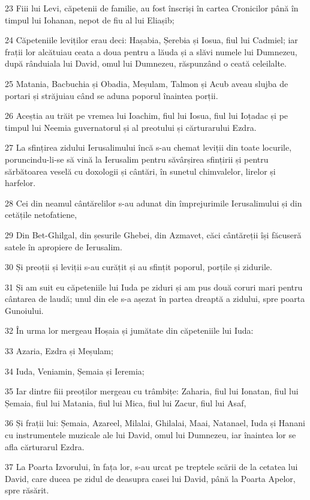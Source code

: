 \par 23 Fiii lui Levi, căpetenii de familie, au fost înscriși în cartea Cronicilor până în timpul lui Iohanan, nepot de fiu al lui Eliașib;
\par 24 Căpeteniile leviților erau deci: Hașabia, Șerebia și Iosua, fiul lui Cadmiel; iar frații lor alcătuiau ceata a doua pentru a lăuda și a slăvi numele lui Dumnezeu, după rânduiala lui David, omul lui Dumnezeu, răspunzând o ceată celeilalte.
\par 25 Matania, Bacbuchia și Obadia, Meșulam, Talmon și Acub aveau slujba de portari și străjuiau când se aduna poporul înaintea porții.
\par 26 Aceștia au trăit pe vremea lui Ioachim, fiul lui Iosua, fiul lui Ioțadac și pe timpul lui Neemia guvernatorul și al preotului și cărturarului Ezdra.
\par 27 La sfințirea zidului Ierusalimului încă s-au chemat leviții din toate locurile, poruncindu-li-se să vină la Ierusalim pentru săvârșirea sfințirii și pentru sărbătoarea veselă cu doxologii și cântări, în sunetul chimvalelor, lirelor și harfelor.
\par 28 Cei din neamul cântărelilor s-au adunat din împrejurimile Ierusalimului și din cetățile netofatiene,
\par 29 Din Bet-Ghilgal, din șesurile Ghebei, din Azmavet, căci cântăreții își făcuseră satele în apropiere de Ierusalim.
\par 30 Și preoții și leviții s-au curățit și au sfințit poporul, porțile și zidurile.
\par 31 Și am suit eu căpeteniile lui Iuda pe ziduri și am pus două coruri mari pentru cântarea de laudă; unul din ele s-a așezat în partea dreaptă a zidului, spre poarta Gunoiului.
\par 32 În urma lor mergeau Hoșaia și jumătate din căpeteniile lui Iuda:
\par 33 Azaria, Ezdra și Meșulam;
\par 34 Iuda, Veniamin, Șemaia și Ieremia;
\par 35 Iar dintre fiii preoților mergeau cu trâmbițe: Zaharia, fiul lui Ionatan, fiul lui Șemaia, fiul lui Matania, fiul lui Mica, fiul lui Zacur, fiul lui Asaf,
\par 36 Și frații lui: Șemaia, Azareel, Milalai, Ghilalai, Maai, Natanael, Iuda și Hanani cu instrumentele muzicale ale lui David, omul lui Dumnezeu, iar înaintea lor se afla cărturarul Ezdra.
\par 37 La Poarta Izvorului, în fața lor, s-au urcat pe treptele scării de la cetatea lui David, care ducea pe zidul de deasupra casei lui David, până la Poarta Apelor, spre răsărit.
